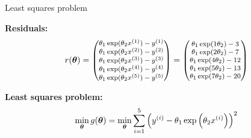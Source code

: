 \documentclass[11pt,compress,t,notes=noshow, xcolor=table]{beamer}
\begin{document}
\begin{vbframe}{Least squares problem}

\textbf{Residuals:}
\begin{equation*}
    \footnotesize
    r(\bm{\theta}) = \begin{pmatrix} 
        \theta_1 \exp(\theta_2 x^{(1)}) - y^{(1)} \\
        \theta_1 \exp(\theta_2 x^{(2)}) - y^{(2)} \\
        \theta_1 \exp(\theta_2 x^{(3)}) - y^{(3)} \\
        \theta_1 \exp(\theta_2 x^{(4)}) - y^{(4)} \\
        \theta_1 \exp(\theta_2 x^{(5)}) - y^{(5)}
     \end{pmatrix} = \begin{pmatrix} 
        \theta_1 \exp(1 \theta_2) - 3 \\
        \theta_1 \exp(2 \theta_2) - 7 \\
        \theta_1 \exp(4 \theta_2) - 12 \\
        \theta_1 \exp(5 \theta_2) - 13 \\
        \theta_1 \exp(7 \theta_2) - 20
     \end{pmatrix}
\end{equation*}

\textbf{Least squares problem:}
\begin{equation*}
    \min_{\bm{\theta}} g(\bm{\theta}) = \min_{\bm{\theta}} \sum_{i=1}^{5} \left(y^{(i)} - \theta_1 \exp\left(\theta_2 x^{(i)}\right)\right)^2
\end{equation*}

\end{vbframe}
\end{document}
